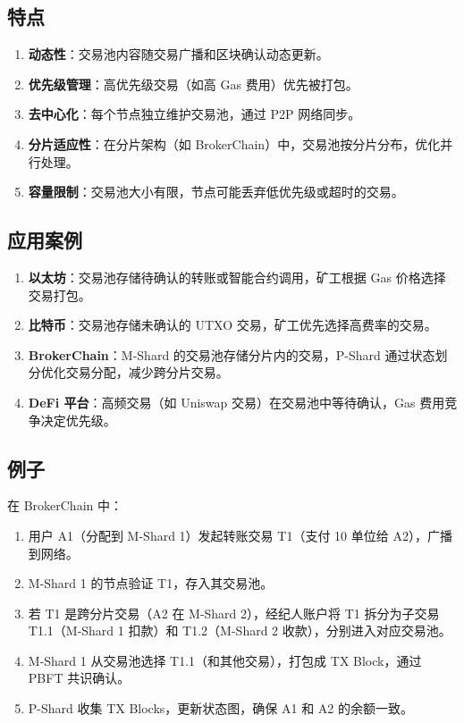 \documentclass[12pt]{ctexart}
\begin{document}
\subsection{特点}
\begin{enumerate}
    \item \textbf{动态性}：交易池内容随交易广播和区块确认动态更新。
    \item \textbf{优先级管理}：高优先级交易（如高 Gas 费用）优先被打包。
    \item \textbf{去中心化}：每个节点独立维护交易池，通过 P2P 网络同步。
    \item \textbf{分片适应性}：在分片架构（如 BrokerChain）中，交易池按分片分布，优化并行处理。
    \item \textbf{容量限制}：交易池大小有限，节点可能丢弃低优先级或超时的交易。
\end{enumerate}

\subsection{应用案例}
\begin{enumerate}
    \item \textbf{以太坊}：交易池存储待确认的转账或智能合约调用，矿工根据 Gas 价格选择交易打包。
    \item \textbf{比特币}：交易池存储未确认的 UTXO 交易，矿工优先选择高费率的交易。
    \item \textbf{BrokerChain}：M-Shard 的交易池存储分片内的交易，P-Shard 通过状态划分优化交易分配，减少跨分片交易。
    \item \textbf{DeFi 平台}：高频交易（如 Uniswap 交易）在交易池中等待确认，Gas 费用竞争决定优先级。
\end{enumerate}

\subsection{例子}
在 BrokerChain 中：
\begin{enumerate}
    \item 用户 A1（分配到 M-Shard 1）发起转账交易 T1（支付 10 单位给 A2），广播到网络。
    \item M-Shard 1 的节点验证 T1，存入其交易池。
    \item 若 T1 是跨分片交易（A2 在 M-Shard 2），经纪人账户将 T1 拆分为子交易 T1.1（M-Shard 1 扣款）和 T1.2（M-Shard 2 收款），分别进入对应交易池。
    \item M-Shard 1 从交易池选择 T1.1（和其他交易），打包成 TX Block，通过 PBFT 共识确认。
    \item P-Shard 收集 TX Blocks，更新状态图，确保 A1 和 A2 的余额一致。
\end{enumerate}
\end{document}
